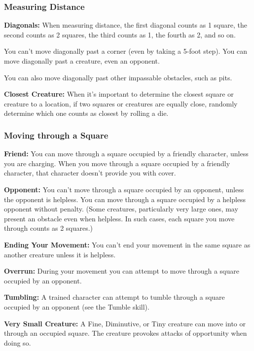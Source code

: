 \documentclass{article}
\begin{document}
\vspace{12pt}
\subsubsection*{\textbf{Measuring Distance}}

\textbf{Diagonals:} When measuring distance, the first diagonal counts as 1 square, 
the second counts as 2 squares, the third counts as 1, the fourth as 2, and so 
on.

You can't move diagonally past a corner (even by taking a 5-foot step). You can 
move diagonally past a creature, even an opponent.

You can also move diagonally past other impassable obstacles, such as pits.

\textbf{Closest Creature:} When it's important to determine the closest square 
or creature to a location, if two squares or creatures are equally close, randomly 
determine which one counts as closest by rolling a die.

\vspace{12pt}
\subsubsection*{\textbf{Moving through a Square}}

\textbf{Friend:} You can move through a square occupied by a friendly character, 
unless you are charging. When you move through a square occupied by a friendly 
character, that character doesn't provide you with cover.

\textbf{Opponent:} You can't move through a square occupied by an opponent, unless 
the opponent is helpless. You can move through a square occupied by a helpless 
opponent without penalty. (Some creatures, particularly very large ones, may present 
an obstacle even when helpless. In such cases, each square you move through counts 
as 2 squares.)

\textbf{Ending Your Movement:} You can't end your movement in the same square as 
another creature unless it is helpless.

\textbf{Overrun:} During your movement you can attempt to move through a square 
occupied by an opponent.

\textbf{Tumbling:} A trained character can attempt to tumble through a square occupied 
by an opponent (see the Tumble skill).

\textbf{Very Small Creature:} A Fine, Diminutive, or Tiny creature can move into 
or through an occupied square. The creature provokes attacks of opportunity when 
doing so.
\end{document}
